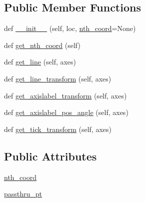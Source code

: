 \subsection*{Public Member Functions}
\begin{DoxyCompactItemize}
\item 
def \hyperlink{classaxisartist_1_1axislines_1_1AxisArtistHelper_1_1Fixed_a70d792fea132744c0934fa974ad54170}{\+\_\+\+\_\+init\+\_\+\+\_\+} (self, loc, \hyperlink{classaxisartist_1_1axislines_1_1AxisArtistHelper_1_1Fixed_af95a4c28a2738808b1780bc315216227}{nth\+\_\+coord}=None)
\item 
def \hyperlink{classaxisartist_1_1axislines_1_1AxisArtistHelper_1_1Fixed_ad1ceec966b3aa9f20a0fe43ff229f3a3}{get\+\_\+nth\+\_\+coord} (self)
\item 
def \hyperlink{classaxisartist_1_1axislines_1_1AxisArtistHelper_1_1Fixed_a033f065e04baea476ce7bf7491b20c73}{get\+\_\+line} (self, axes)
\item 
def \hyperlink{classaxisartist_1_1axislines_1_1AxisArtistHelper_1_1Fixed_a14823006f4a34d115a33cbff5d8faaf0}{get\+\_\+line\+\_\+transform} (self, axes)
\item 
def \hyperlink{classaxisartist_1_1axislines_1_1AxisArtistHelper_1_1Fixed_a5581fdb5e41fbf7c786e7cbd82ac351e}{get\+\_\+axislabel\+\_\+transform} (self, axes)
\item 
def \hyperlink{classaxisartist_1_1axislines_1_1AxisArtistHelper_1_1Fixed_adad167a6021715e345a7dc05405bc5b8}{get\+\_\+axislabel\+\_\+pos\+\_\+angle} (self, axes)
\item 
def \hyperlink{classaxisartist_1_1axislines_1_1AxisArtistHelper_1_1Fixed_a650ff8e70ecde6c92100bb426551f9e6}{get\+\_\+tick\+\_\+transform} (self, axes)
\end{DoxyCompactItemize}
\subsection*{Public Attributes}
\begin{DoxyCompactItemize}
\item 
\hyperlink{classaxisartist_1_1axislines_1_1AxisArtistHelper_1_1Fixed_af95a4c28a2738808b1780bc315216227}{nth\+\_\+coord}
\item 
\hyperlink{classaxisartist_1_1axislines_1_1AxisArtistHelper_1_1Fixed_a7501a0b9c24aa6c8f17770cb3e38e78c}{passthru\+\_\+pt}
\end{DoxyCompactItemize}
